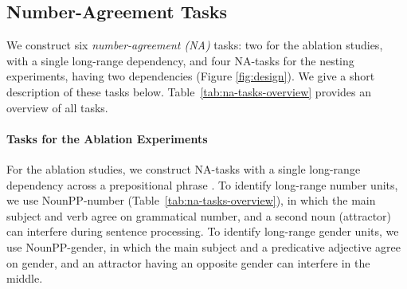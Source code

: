 \subsection{Number-Agreement Tasks}
We construct six \emph{number-agreement (NA)} tasks: two for the ablation studies, with a single long-range dependency, and four NA-tasks for the nesting experiments, having two dependencies (Figure \ref{fig:design}). We give a short description of these tasks below. Table~\ref{tab:na-tasks-overview} provides an overview of all tasks. 



\paragraph{Tasks for the Ablation Experiments} For the ablation studies, we construct NA-tasks with a single long-range dependency across a prepositional phrase \citep{lakretz2019emergence}. To identify long-range number units, we use NounPP-number (Table~\ref{tab:na-tasks-overview}), in which the main subject and verb agree on grammatical number, and a second noun (attractor) can interfere during sentence processing. To identify long-range gender units, we use NounPP-gender, in which the main subject and a predicative adjective agree on gender, and an attractor having an opposite gender can interfere in the middle. 

